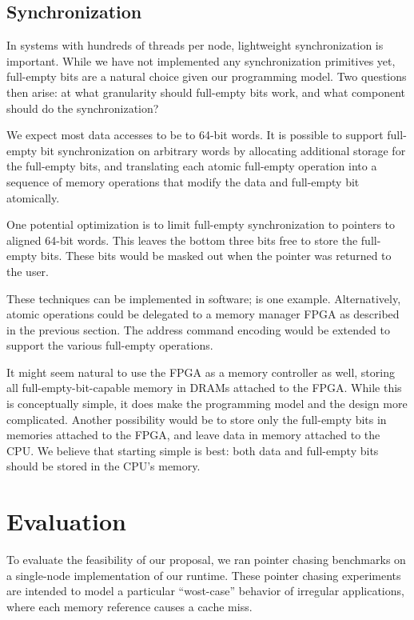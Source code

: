 \documentclass{acm_proc_article-sp}
\begin{document}
\subsection{Synchronization}

In systems with hundreds of threads per node, lightweight
synchronization is important. While we have not implemented any
synchronization primitives yet, full-empty bits are a natural choice
given our programming model. Two questions then arise: at what
granularity should full-empty bits work, and what component should do
the synchronization?

We expect most data accesses to be to 64-bit words. It is possible to
support full-empty bit synchronization on arbitrary words by
allocating additional storage for the full-empty bits, and translating
each atomic full-empty operation into a sequence of memory operations
that modify the data and full-empty bit atomically. 

One potential optimization is to limit full-empty synchronization to
pointers to aligned 64-bit words. This leaves the bottom three bits
free to store the full-empty bits. These bits would be masked out when
the pointer was returned to the user.

These techniques can be implemented in software; \cite{qthreads} is
one example. Alternatively, atomic operations could be delegated to a
memory manager FPGA as described in the previous section. The address
command encoding would be extended to support the various full-empty
operations.

It might seem natural to use the FPGA as a memory controller as
well, storing all full-empty-bit-capable memory in DRAMs attached to
the FPGA. While this is conceptually simple, it does make the
programming model and the design more complicated. Another possibility
would be to store only the full-empty bits in memories attached to the
FPGA, and leave data in memory attached to the CPU. We believe that
starting simple is best: both data and full-empty bits should be
stored in the CPU's memory. 



\section{Evaluation}

To evaluate the feasibility of our proposal, we ran pointer chasing
benchmarks on a single-node implementation of our runtime. These
pointer chasing experiments are intended to model a particular
``wost-case'' behavior of irregular applications, where each memory
reference causes a cache miss.
\end{document}
